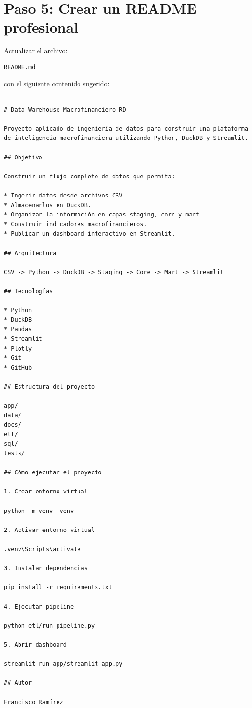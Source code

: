 \section{Paso 5: Crear un README profesional}

Actualizar el archivo:

\begin{verbatim}
README.md
\end{verbatim}

con el siguiente contenido sugerido:

\begin{lstlisting}

# Data Warehouse Macrofinanciero RD

Proyecto aplicado de ingeniería de datos para construir una plataforma de inteligencia macrofinanciera utilizando Python, DuckDB y Streamlit.

## Objetivo

Construir un flujo completo de datos que permita:

* Ingerir datos desde archivos CSV.
* Almacenarlos en DuckDB.
* Organizar la información en capas staging, core y mart.
* Construir indicadores macrofinancieros.
* Publicar un dashboard interactivo en Streamlit.

## Arquitectura

CSV -> Python -> DuckDB -> Staging -> Core -> Mart -> Streamlit

## Tecnologías

* Python
* DuckDB
* Pandas
* Streamlit
* Plotly
* Git
* GitHub

## Estructura del proyecto

app/
data/
docs/
etl/
sql/
tests/

## Cómo ejecutar el proyecto

1. Crear entorno virtual

python -m venv .venv

2. Activar entorno virtual

.venv\Scripts\activate

3. Instalar dependencias

pip install -r requirements.txt

4. Ejecutar pipeline

python etl/run_pipeline.py

5. Abrir dashboard

streamlit run app/streamlit_app.py

## Autor

Francisco Ramírez
\end{lstlisting}

